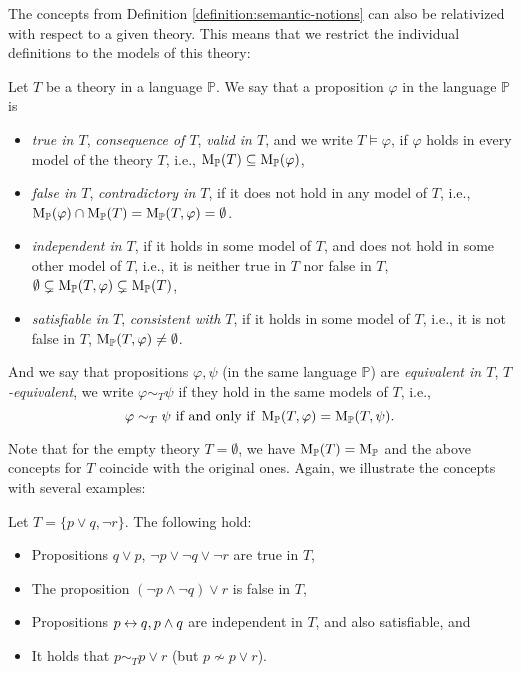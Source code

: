 The concepts from Definition \ref{definition:semantic-notions} can also be relativized with respect to a given theory. This means that we restrict the individual definitions to the models of this theory:

\begin{definition}
    Let $T$ be a theory in a language $\mathbb{P}$. We say that a proposition $\varphi$ in the language $\mathbb{P}$ is
    \begin{itemize}
        \item \emph{true in $T$}, \emph{consequence of $T$}, \emph{valid in $T$}, and we write $T \models \varphi$, if $\varphi$ holds in every model of the theory $T$, i.e., $\operatorname{M}_\mathbb{P}(T) \subseteq \operatorname{M}_\mathbb{P}(\varphi)$,
        \item \emph{false in $T$}, \emph{contradictory in $T$}, if it does not hold in any model of $T$, i.e., $\operatorname{M}_\mathbb{P}(\varphi) \cap \operatorname{M}_\mathbb{P}(T) = \operatorname{M}_\mathbb{P}(T,\varphi) = \emptyset$.
        \item \emph{independent in $T$}, if it holds in some model of $T$, and does not hold in some other model of $T$, i.e., it is neither true in $T$ nor false in $T$, $\emptyset \subsetneq \operatorname{M}_\mathbb{P}(T,\varphi) \subsetneq \operatorname{M}_\mathbb{P}(T)$,
        \item \emph{satisfiable in $T$}, \emph{consistent with $T$}, if it holds in some model of $T$, i.e., it is not false in $T$, $\operatorname{M}_\mathbb{P}(T,\varphi) \neq \emptyset$.
    \end{itemize}
    And we say that propositions $\varphi, \psi$ (in the same language $\mathbb{P}$) are \emph{equivalent in $T$}, \emph{$T$-equivalent}, we write $\varphi \sim_T \psi$ if they hold in the same models of $T$, i.e.,
    $$
    \varphi \sim_T \psi \text{ if and only if } \operatorname{M}_\mathbb{P}(T,\varphi) = \operatorname{M}_\mathbb{P}(T,\psi).
    $$
\end{definition}

Note that for the empty theory $T = \emptyset$, we have $\operatorname{M}_\mathbb{P}(T) = \operatorname{M}_\mathbb{P}$ and the above concepts for $T$ coincide with the original ones. Again, we illustrate the concepts with several examples:

\begin{example} Let $T = \{p \lor q, \neg r\}$. The following hold:
    \begin{itemize}
        \item Propositions $q \lor p$, $\neg p \lor \neg q \lor \neg r$ are true in $T$,
        \item The proposition $(\neg p \land \neg q) \lor r$ is false in $T$,
        \item Propositions $p \mathbin{\leftrightarrow} q, p \land q$ are independent in $T$, and also satisfiable, and
        \item It holds that $p \sim_T p \lor r$ (but $p \not\sim p \lor r$).
    \end{itemize}      
\end{example}

